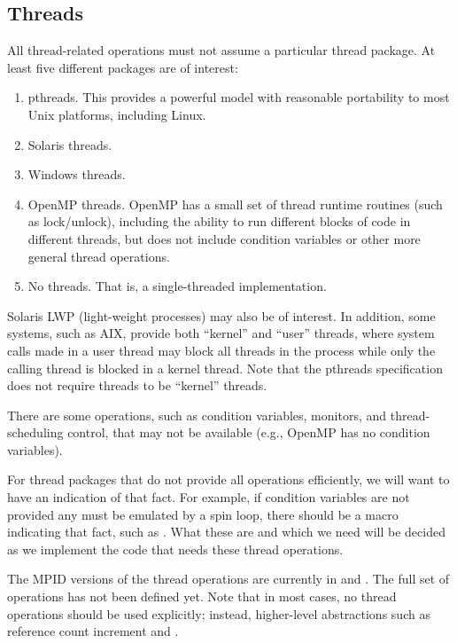 \documentclass{article}
\begin{document}
\subsection{Threads}
\label{sec:threads}
All thread-related operations must not assume a particular thread
package.  At least five different packages are of interest:
\begin{enumerate}
\item pthreads.  This provides a powerful model with reasonable
portability to most Unix platforms, including Linux.  

\item Solaris threads.

\item Windows threads.  

\item OpenMP threads.  OpenMP has a small set of thread runtime
routines (such as lock/unlock), including the ability to run different blocks
of code in different threads, but does not include condition variables
or other more general thread operations.

\item No threads.  That is, a single-threaded implementation.  
\end{enumerate}
Solaris LWP (light-weight processes) may also be of interest.  In
addition, some systems, such as AIX, provide both ``kernel'' and
``user'' threads, where system calls made in a user thread may block
all threads in the process while only the calling thread is blocked in
a kernel thread.  Note that the pthreads specification does not
require threads to be ``kernel'' threads. 

There are some operations, such as condition variables, monitors, and
thread-scheduling control, that may not be available (e.g., OpenMP
has no condition variables).  

For thread packages that do not provide all operations efficiently, we
will want to have an indication of that fact.  For example, if
condition variables are not provided any must be emulated by a spin
loop, there should be a macro indicating that fact, such as
.  What these are and which we need
will be decided as we implement the code that needs these thread
operations.

The MPID versions of the thread operations are currently in 
 and
.  The full set of operations has not
been defined yet.  Note that in most cases, no thread
operations should be used explicitly; instead, higher-level
abstractions such as reference count increment and
. 
\end{document}

